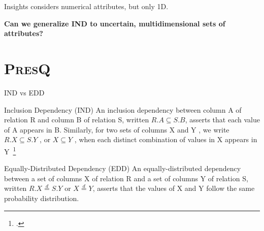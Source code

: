 \documentclass[10pt]{beamer}
\newcommand{\PresQ}[0]{\textsc{PresQ}\xspace}
\newcommand{\eqdist}{\stackrel{d}{=}}
\begin{document}
\begin{frame}{Insights}
    \cite{alawini2016} considers numerical attributes, but only 1D.
    
    \alert{\textbf{Can we generalize IND to uncertain, multidimensional sets of attributes?}}
\end{frame}


\section{\PresQ}


\begin{frame}{IND vs EDD}
    \begin{block}{Inclusion Dependency (IND)}
        \smallskip
        An inclusion dependency between column A of relation
        R and column B of relation S, written $R.A \subseteq S.B$, asserts that each
        value of A appears in B. Similarly, for two sets of columns X
        and Y , we write $R.X \subseteq S.Y$ , or $X \subseteq Y$ , when each distinct
        combination of values in X appears in Y~\footcite{abedjan2015}
    \end{block}
    \begin{block}{\alert{Equally-Distributed Dependency (EDD)}}
        \smallskip
        An equally-distributed dependency between a set of columns X
        of relation R and a set of columns Y of relation S, written $R.X \eqdist S.Y$ or
        $X \eqdist Y$, asserts that the values of X and Y follow the same probability distribution.
    \end{block}

\end{frame}
\end{document}
